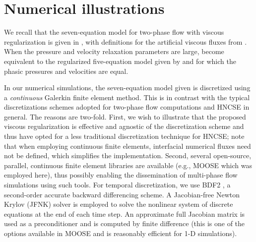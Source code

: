 \section{Numerical illustrations}\label{sec:num-ill}

We recall that the seven-equation model for two-phase flow with viscous regularization is given 
in , with definitions for the artificial viscous fluxes 
from . 
%
When the pressure and velocity relaxation parameters are large,  
become equivalent to the regularized five-equation model given by  and for which 
the phasic pressures and velocities are equal.


In our numerical simulations, the seven-equation model given is discretized using a \emph{continuous} Galerkin 
finite element method. This is in contrast with the typical discretizations schemes adopted for 
two-phase flow computations and HNCSE in general. The reasons are two-fold. First, we wish
to illustrate that the proposed viscous regularization is effective and agnostic of the discretization scheme
and thus have opted for a less traditional discretization technique for HNCSE; note that when employing continuous finite
elements, interfacial numerical fluxes need not be defined, which simplifies the implementation. Second, several open-source, 
parallel, continuous finite element libraries are available (e.g., MOOSE \cite{moose} which was employed here),
thus possibly enabling the dissemination of multi-phase flow simulations using such tools. 
For temporal discretization, we use BDF2 \cite{bdf2}, a second-order accurate backward differencing scheme. 
A Jacobian-free Newton Krylov (JFNK) solver is employed to solve the nonlinear system of discrete equations 
at the end of each time step. An approximate full Jacobian matrix is used as a preconditioner and is computed by finite difference 
(this is one of the options available in MOOSE and is reasonably efficient for 1-D simulations). 

